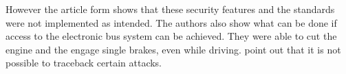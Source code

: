 	However the article form \citeauthor{expModernAuto}
	shows that these security features and the standards were not implemented as intended.
	The authors also show what can be done if access to the electronic bus system can be achieved.
	They were able to cut the engine and the engage single brakes,
	even while driving.
	\citeauthor{expModernAuto} point out that it is not possible to traceback certain attacks.	%

